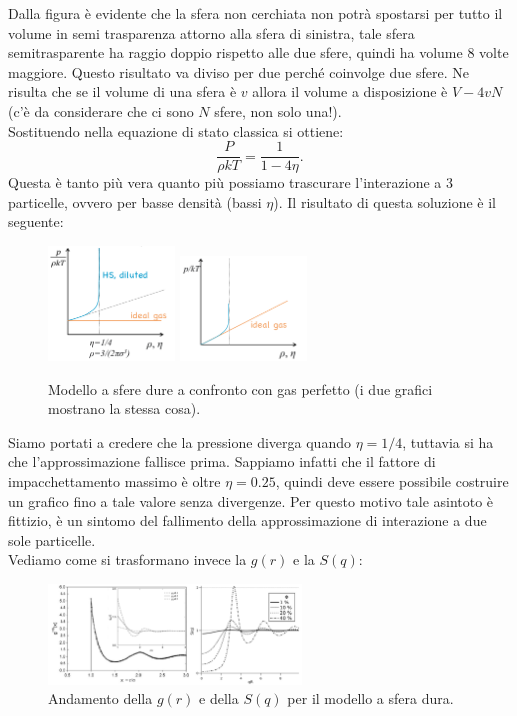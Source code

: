 \noindent
Dalla figura è evidente che la sfera non cerchiata non potrà spostarsi per tutto il volume in semi trasparenza attorno alla sfera di sinistra, tale sfera semitrasparente ha raggio doppio rispetto alle due sfere, quindi ha volume 8 volte maggiore. Questo risultato va diviso per due perché coinvolge due sfere. Ne risulta che se il volume di una sfera è $v$ allora il volume a disposizione è $V-4vN$ (c'è da considerare che ci sono $N$ sfere, non solo una!).\\
Sostituendo nella equazione di stato classica si ottiene:
\[
	\frac{P}{\rho kT} = \frac{1}{1-4\eta}
.\] 
Questa è tanto più vera quanto più possiamo trascurare l'interazione a 3 particelle, ovvero per basse densità (bassi $\eta$). Il risultato di questa soluzione è il seguente:
\begin{figure}[H]
	\centering
	\includegraphics[width=0.3\textwidth]{figures/HS-diluited1.png}
	\includegraphics[width=0.3\textwidth]{figures/HS-diluited2.png}
	\caption{Modello a sfere dure a confronto con gas perfetto (i due grafici mostrano la stessa cosa).}
	\label{fig:figures-HS-diluited1-png}
\end{figure}
\noindent
Siamo portati a credere che la pressione diverga quando $\eta=1/4$, tuttavia si ha che l'approssimazione fallisce prima. Sappiamo infatti che il fattore di impacchettamento massimo è oltre $\eta = 0.25$, quindi deve essere possibile costruire un grafico fino a tale valore senza divergenze. Per questo motivo tale asintoto è fittizio, è un sintomo del fallimento della approssimazione di interazione a due sole particelle.\\
Vediamo come si trasformano invece la $g(r)$ e la $S(q)$:
\begin{figure}[H]
	\centering
	\includegraphics[width=0.6\textwidth]{figures/gr-sfera-dura.png}
	\caption{Andamento della $g(r)$ e della $S(q)$ per il modello a sfera dura.}
	\label{fig:figures-gr-sfera-dura-png}
\end{figure}
